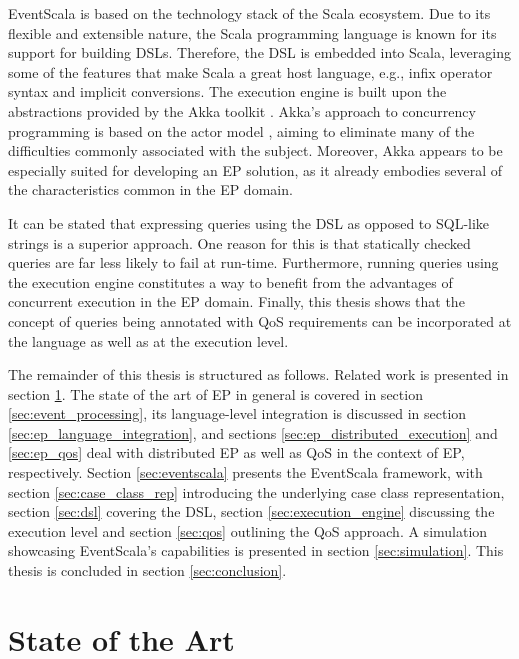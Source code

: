 \documentclass[article, 10pt, type=bsc, colorback, accentcolor=tud8b, parskip=half, bibliography=totocnumbered]{tudthesis}
\begin{document}
EventScala is based on the technology stack of the Scala ecosystem.
Due to its flexible and extensible nature, the Scala programming language is known for its support for building DSLs.
Therefore, the DSL is embedded into Scala, leveraging some of the features that make Scala a great host language, e.g., infix operator syntax and implicit conversions.
The execution engine is built upon the abstractions provided by the Akka toolkit \cite{akka}.
Akka's approach to concurrency programming is based on the actor model \cite{Hewitt:1973:UMA:1624775.1624804}, aiming to eliminate many of the difficulties commonly associated with the subject.
Moreover, Akka appears to be especially suited for developing an EP solution, as it already embodies several of the characteristics common in the EP domain.

It can be stated that expressing queries using the DSL as opposed to SQL-like strings is a superior approach.
One reason for this is that statically checked queries are far less likely to fail at run-time.
Furthermore, running queries using the execution engine constitutes a way to benefit from the advantages of concurrent execution in the EP domain.
Finally, this thesis shows that the concept of queries being annotated with QoS requirements can be incorporated at the language as well as at the execution level.

The remainder of this thesis is structured as follows.
Related work is presented in section \ref{sec:state_of_the_art}.
The state of the art of EP in general is covered in section \ref{sec:event_processing}, its language-level integration is discussed in section \ref{sec:ep_language_integration}, and sections \ref{sec:ep_distributed_execution} and \ref{sec:ep_qos} deal with distributed EP as well as QoS in the context of EP, respectively.
Section \ref{sec:eventscala} presents the EventScala framework, with section \ref{sec:case_class_rep} introducing the underlying case class representation, section \ref{sec:dsl} covering the DSL, section \ref{sec:execution_engine} discussing the execution level and section \ref{sec:qos} outlining the QoS approach.
A simulation showcasing EventScala's capabilities is presented in section \ref{sec:simulation}.
This thesis is concluded in section \ref{sec:conclusion}. 

\newpage

\section{State of the Art}
\label{sec:state_of_the_art}
\end{document}
